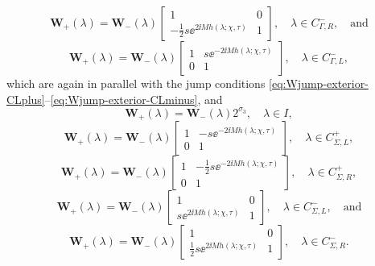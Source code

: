 \begin{equation}
\mathbf{W}_{+}(\lambda) = \mathbf{W}_{-}(\lambda)
\begin{bmatrix} 1 & 0 \\ -\frac{1}{2}s  \ee^{2\ii M h(\lambda;\chi,\tau)} & 1 \end{bmatrix} ,\quad \lambda\in C^-_{\Gamma,R},\quad\text{and}
\end{equation}
\begin{equation}
\mathbf{W}_{+}(\lambda) = \mathbf{W}_{-}(\lambda)
\begin{bmatrix} 1 &  s \ee^{-2\ii M h(\lambda;\chi,\tau)} \\ 0 & 1 \end{bmatrix} ,\quad \lambda\in C^-_{\Gamma,L},
\end{equation}
which are again in parallel with the jump conditions \eqref{eq:Wjump-exterior-CLplus}--\eqref{eq:Wjump-exterior-CLminus}, and
\begin{equation}
\mathbf{W}_{+}(\lambda) = \mathbf{W}_{-}(\lambda)
2^{\sigma_3},\quad \lambda\in I ,
\label{eq:W-jump-I}
\end{equation}
\begin{equation}
\mathbf{W}_{+}(\lambda) = \mathbf{W}_{-}(\lambda)
\begin{bmatrix} 1 & -s  \ee^{-2\ii M h(\lambda;\chi,\tau)} \\ 0 & 1 \end{bmatrix},\quad \lambda\in C^+_{\Sigma,L},
\end{equation}
\begin{equation}
\mathbf{W}_{+}(\lambda) = \mathbf{W}_{-}(\lambda)
\begin{bmatrix} 1 & -\frac{1}{2} s \ee^{-2\ii M h(\lambda;\chi,\tau)} \\ 0 & 1 \end{bmatrix},\quad \lambda\in C^+_{\Sigma,R},
\end{equation}
\begin{equation}
\mathbf{W}_{+}(\lambda) = \mathbf{W}_{-}(\lambda)
\begin{bmatrix} 1 & 0 \\ s  \ee^{2\ii M h(\lambda;\chi,\tau)} & 1 \end{bmatrix},\quad \lambda\in C^-_{\Sigma,L},\quad\text{and}
\end{equation}
\begin{equation}
\mathbf{W}_{+}(\lambda) = \mathbf{W}_{-}(\lambda)
\begin{bmatrix} 1 & 0 \\ \frac{1}{2} s  \ee^{2\ii M h(\lambda;\chi,\tau)} & 1 \end{bmatrix},\quad \lambda\in C^-_{\Sigma,R}.
\label{eq:W-jump-Sigma-minus-R-ALT}
\end{equation}
